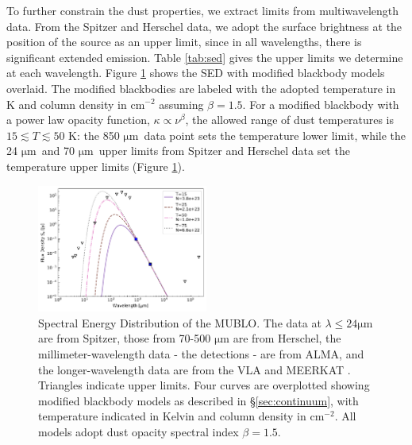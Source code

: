 \documentclass[]{aastex631}
\newcommand{\um}{\ensuremath{\mathrm{\mu m}}\xspace}
\newcommand{\persc}{\ensuremath{\mathrm{cm}^{-2}}\xspace}
\begin{document}
To further constrain the dust properties, we extract limits from multiwavelength data.
From the Spitzer \citep{Ramirez2008,Carey2009} and Herschel \citep{Traficante2011} data, we adopt the surface brightness at the position of the source as an upper limit, since in all wavelengths, there is significant extended emission.
Table \ref{tab:sed} gives the upper limits we determine at each wavelength.
Figure \ref{fig:SED} shows the SED with modified blackbody models overlaid.
The modified blackbodies are labeled with the adopted temperature in K and column density in \persc assuming $\beta=1.5$.
For a modified blackbody with a power law opacity function, $\kappa\propto\nu^\beta$, the allowed range of dust temperatures is $15 \lesssim T \lesssim 50$ K: the 850 \um~data point sets the temperature lower limit, while the 24 \um~and 70 \um~upper limits from Spitzer and Herschel data set the temperature upper limits (Figure \ref{fig:SED}).



\begin{figure}[!ht]
    \centering
    \includegraphics[width=0.5\textwidth]{figures/SED_with_upperlimits_VLA.pdf}
    \caption{Spectral Energy Distribution of the MUBLO.
    The data at $\lambda \leq 24\um$ are from Spitzer, those from 70-500 \um are from Herschel, the millimeter-wavelength data - the detections - are from ALMA, and the longer-wavelength data are from the VLA \citep{Lu2019} and MEERKAT \citep{Heywood2022}.
    Triangles indicate upper limits.
    Four curves are overplotted showing modified blackbody models as described in \S \ref{sec:continuum}, with temperature indicated in Kelvin and column density in \persc.
    All models adopt dust opacity spectral index $\beta=1.5$.
    }
    \label{fig:SED}
\end{figure}




\clearpage
\end{document}
